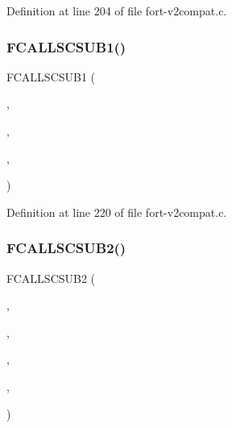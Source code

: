 Definition at line 204 of file fort-\/v2compat.\+c.

\mbox{\label{fort-v2compat_8c_ae3a654f180e14021674a31a166b7d6a8}} 
\subsubsection{\texorpdfstring{F\+C\+A\+L\+L\+S\+C\+S\+U\+B1()}{FCALLSCSUB1()}\hspace{0.1cm}{\footnotesize\ttfamily [2/2]}}
{\footnotesize\ttfamily F\+C\+A\+L\+L\+S\+C\+S\+U\+B1 (\begin{DoxyParamCaption}\item[{\hyperlink{nf__v2compat_8c_aac642849eafe9806b7b660bbe5c50cd1}{c\+\_\+ncgopt}}]{,  }\item[{N\+C\+G\+O\+PT}]{,  }\item[{\hyperlink{nf__fortv2_8f90_a4fe1ac0350a63230cc17e880d496efa3}{ncgopt}}]{,  }\item[{\hyperlink{fort-v2compat_8c_ad28923cfdb7eaecc17fef3711c74befc}{P\+N\+C\+O\+P\+TS}}]{ }\end{DoxyParamCaption})}



Definition at line 220 of file fort-\/v2compat.\+c.

\mbox{\label{fort-v2compat_8c_a070281e62436c1160f0aac8a216371df}} 
\subsubsection{\texorpdfstring{F\+C\+A\+L\+L\+S\+C\+S\+U\+B2()}{FCALLSCSUB2()}\hspace{0.1cm}{\footnotesize\ttfamily [1/5]}}
{\footnotesize\ttfamily F\+C\+A\+L\+L\+S\+C\+S\+U\+B2 (\begin{DoxyParamCaption}\item[{\hyperlink{nf__v2compat_8c_ac9314266e433d48e369f2247d3f8a918}{c\+\_\+ncclos}}]{,  }\item[{N\+C\+C\+L\+OS}]{,  }\item[{\hyperlink{nf__fortv2_8f90_a03f16672189e09514f5df0a9d72e6859}{ncclos}}]{,  }\item[{N\+C\+ID}]{,  }\item[{\hyperlink{fort-v2compat_8c_ae2352f39cbd25bcaf1bedbbb12db73fe}{P\+R\+C\+O\+DE}}]{ }\end{DoxyParamCaption})}




